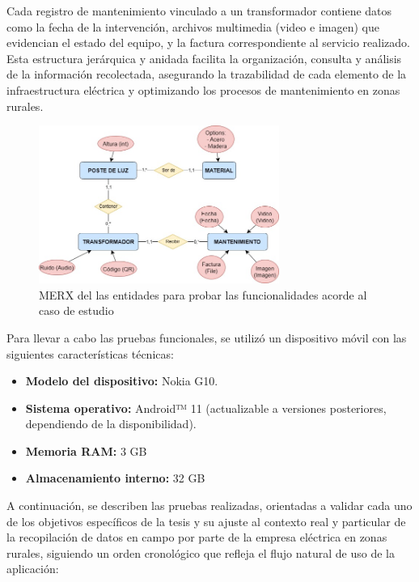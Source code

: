 \documentclass{article}
\begin{document}
Cada registro de mantenimiento vinculado a un transformador contiene datos como la fecha de la intervención, archivos multimedia (video e imagen) que evidencian el estado del equipo, y la factura correspondiente al servicio realizado. Esta estructura jerárquica y anidada facilita la organización, consulta y análisis de la información recolectada, asegurando la trazabilidad de cada elemento de la infraestructura eléctrica y optimizando los procesos de mantenimiento en zonas rurales.

\begin{figure}[H]
  \centering
  \includegraphics[width=0.7\textwidth]{images/functionality_test/caso_estudio.jpg}
  \caption{MERX del las entidades para probar las funcionalidades acorde al caso de estudio}
  \label{fig:casoestudio}
\end{figure}

Para llevar a cabo las pruebas funcionales, se utilizó un dispositivo móvil con las siguientes características técnicas:

\begin{itemize}
    \item \textbf{Modelo del dispositivo:} Nokia G10.
    \item \textbf{Sistema operativo:} Android™ 11 (actualizable a versiones posteriores, dependiendo de la disponibilidad).
    \item \textbf{Memoria RAM:} 3 GB
    \item \textbf{Almacenamiento interno:} 32 GB
\end{itemize}

A continuación, se describen las pruebas realizadas, orientadas a validar cada uno de los objetivos específicos de la tesis y su ajuste al contexto real y particular de la recopilación de datos en campo por parte de la empresa eléctrica en zonas rurales, siguiendo un orden cronológico que refleja el flujo natural de uso de la aplicación:
\end{document}
